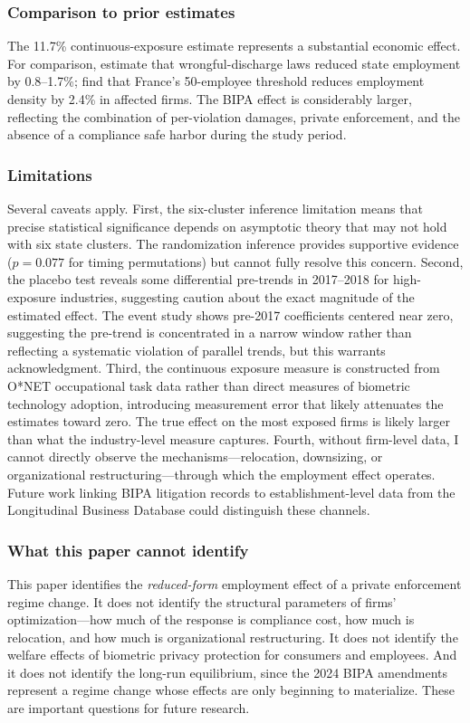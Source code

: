 \documentclass[12pt]{article}
\begin{document}
\subsubsection*{Comparison to prior estimates} The 11.7\% continuous-exposure estimate represents a substantial economic effect. For comparison, \citet{autor2007} estimate that wrongful-discharge laws reduced state employment by 0.8--1.7\%; \citet{garicano2016} find that France's 50-employee threshold reduces employment density by 2.4\% in affected firms. The BIPA effect is considerably larger, reflecting the combination of per-violation damages, private enforcement, and the absence of a compliance safe harbor during the study period.

\subsubsection*{Limitations} Several caveats apply. First, the six-cluster inference limitation means that precise statistical significance depends on asymptotic theory that may not hold with six state clusters. The randomization inference provides supportive evidence ($p = 0.077$ for timing permutations) but cannot fully resolve this concern. Second, the placebo test reveals some differential pre-trends in 2017--2018 for high-exposure industries, suggesting caution about the exact magnitude of the estimated effect. The event study shows pre-2017 coefficients centered near zero, suggesting the pre-trend is concentrated in a narrow window rather than reflecting a systematic violation of parallel trends, but this warrants acknowledgment. Third, the continuous exposure measure is constructed from O*NET occupational task data rather than direct measures of biometric technology adoption, introducing measurement error that likely attenuates the estimates toward zero. The true effect on the most exposed firms is likely larger than what the industry-level measure captures. Fourth, without firm-level data, I cannot directly observe the mechanisms---relocation, downsizing, or organizational restructuring---through which the employment effect operates. Future work linking BIPA litigation records to establishment-level data from the Longitudinal Business Database could distinguish these channels.

\subsubsection*{What this paper cannot identify} This paper identifies the \textit{reduced-form} employment effect of a private enforcement regime change. It does not identify the structural parameters of firms' optimization---how much of the response is compliance cost, how much is relocation, and how much is organizational restructuring. It does not identify the welfare effects of biometric privacy protection for consumers and employees. And it does not identify the long-run equilibrium, since the 2024 BIPA amendments represent a regime change whose effects are only beginning to materialize. These are important questions for future research.
\end{document}
